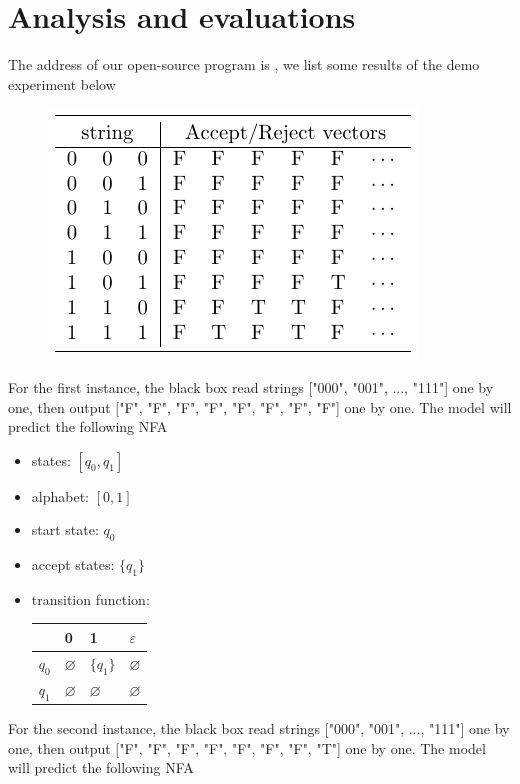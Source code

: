 \documentclass{article}
\begin{document}
\section{Analysis and evaluations}
The address of our open-source program is , we list some results of the demo experiment below
\begin{figure}[H]
    \centering
    \includegraphics[width=0.75\linewidth]{src/experiments.pdf}
    \label{tab: experiments}
\end{figure}
For the first instance, the black box read strings ["000", "001", ..., "111"] one by one, then output ["F", "F", "F", "F", "F", "F", "F", "F"] one by one. The model will predict the following NFA
\begin{itemize}
    \item states: $[q_0, q_1]$
    \item alphabet: $[0, 1]$
    \item start state: $q_0$
    \item accept states: $\{ q_1 \}$
    \item transition function: 
    \begin{tabular}{l|lll}
              & 0             & 1             & $\varepsilon$ \\ \hline
        $q_0$ & $\varnothing$ & $\{ q_1 \}$   & $\varnothing$ \\   
        $q_1$ & $\varnothing$ & $\varnothing$ & $\varnothing$ \\  
    \end{tabular}
\end{itemize}
For the second instance, the black box read strings ["000", "001", ..., "111"] one by one, then output ["F", "F", "F", "F", "F", "F", "F", "T"] one by one. The model will predict the following NFA
\end{document}
